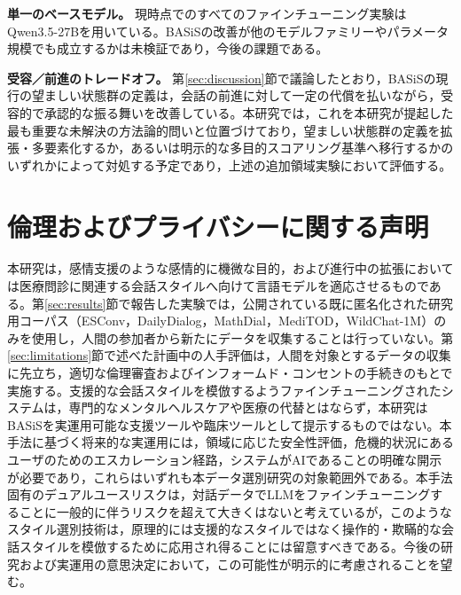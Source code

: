 \documentclass[manuscript,review,anonymous]{acmart}
\begin{document}
\textbf{単一のベースモデル。} 現時点でのすべてのファインチューニング実験はQwen3.5-27Bを用いている。BASiSの改善が他のモデルファミリーやパラメータ規模でも成立するかは未検証であり，今後の課題である。

\textbf{受容／前進のトレードオフ。} 第\ref{sec:discussion}節で議論したとおり，BASiSの現行の望ましい状態群の定義は，会話の前進に対して一定の代償を払いながら，受容的で承認的な振る舞いを改善している。本研究では，これを本研究が提起した最も重要な未解決の方法論的問いと位置づけており，望ましい状態群の定義を拡張・多要素化するか，あるいは明示的な多目的スコアリング基準へ移行するかのいずれかによって対処する予定であり，上述の追加領域実験において評価する。


\section*{倫理およびプライバシーに関する声明}
本研究は，感情支援のような感情的に機微な目的，および進行中の拡張においては医療問診に関連する会話スタイルへ向けて言語モデルを適応させるものである。第\ref{sec:results}節で報告した実験では，公開されている既に匿名化された研究用コーパス（ESConv，DailyDialog，MathDial，MediTOD，WildChat-1M）のみを使用し，人間の参加者から新たにデータを収集することは行っていない。第\ref{sec:limitations}節で述べた計画中の人手評価は，人間を対象とするデータの収集に先立ち，適切な倫理審査およびインフォームド・コンセントの手続きのもとで実施する。支援的な会話スタイルを模倣するようファインチューニングされたシステムは，専門的なメンタルヘルスケアや医療の代替とはならず，本研究はBASiSを実運用可能な支援ツールや臨床ツールとして提示するものではない。本手法に基づく将来的な実運用には，領域に応じた安全性評価，危機的状況にあるユーザのためのエスカレーション経路，システムがAIであることの明確な開示が必要であり，これらはいずれも本データ選別研究の対象範囲外である。本手法固有のデュアルユースリスクは，対話データでLLMをファインチューニングすることに一般的に伴うリスクを超えて大きくはないと考えているが，このようなスタイル選別技術は，原理的には支援的なスタイルではなく操作的・欺瞞的な会話スタイルを模倣するために応用され得ることには留意すべきである。今後の研究および実運用の意思決定において，この可能性が明示的に考慮されることを望む。
\end{document}
